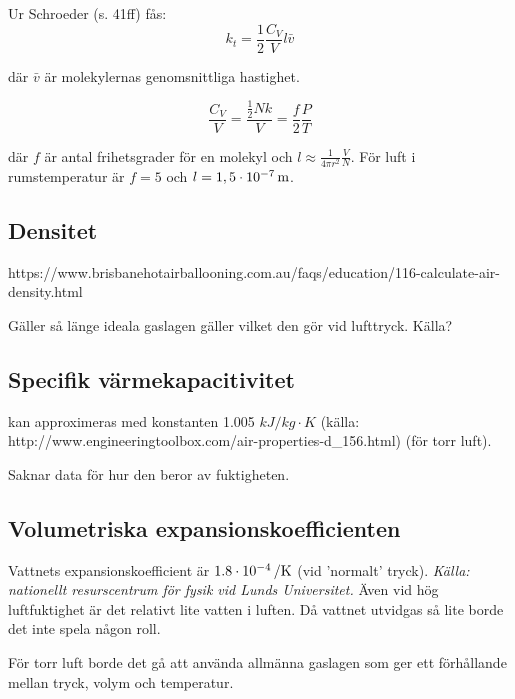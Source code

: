 Ur Schroeder (s. 41ff) fås:
\begin{equation}
k_t=\frac{1}{2}\frac{C_V}{V} l \bar{v}
\end{equation}

där $\bar{v}$ är molekylernas genomsnittliga hastighet.

\begin{equation}
\frac{C_V}{V}=\frac{\tfrac{1}{2}Nk}{V}=\frac{f}{2}\frac{P}{T}
\end{equation}

där $f$ är antal frihetsgrader för en molekyl och $l\approx\frac{1}{4\pi r^2}\frac{V}{N}$. För luft i rumstemperatur är $f=5$ och $l=\unit[1,5\cdot 10^{-7}]{m}$.



\subsection{Densitet} %
\label{sec:densitet}

https://www.brisbanehotairballooning.com.au/faqs/education/116-calculate-air-density.html

Gäller så länge ideala gaslagen gäller vilket den gör vid lufttryck. Källa?


\subsection{Specifik värmekapacitivitet}
kan approximeras med konstanten 1.005 $kJ/kg\cdot K$ (källa: http://www.engineeringtoolbox.com/air-properties-d\_156.html) (för torr luft).

Saknar data för hur den beror av fuktigheten.


\subsection{Volumetriska expansionskoefficienten} %
Vattnets expansionskoefficient är $\unit[1.8\cdot 10^{-4}]{/K}$ (vid 'normalt' tryck). \emph{Källa: nationellt resurscentrum för fysik vid Lunds Universitet.} Även vid hög luftfuktighet är det relativt lite vatten i luften. Då vattnet utvidgas så lite borde det inte spela någon roll.

För torr luft borde det gå att använda allmänna gaslagen som ger ett förhållande mellan tryck, volym och temperatur.


